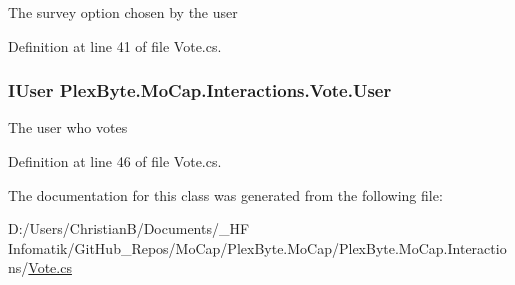The survey option chosen by the user 



Definition at line 41 of file Vote.\+cs.

\subsubsection[{\texorpdfstring{User}{User}}]{\setlength{\rightskip}{0pt plus 5cm}I\+User Plex\+Byte.\+Mo\+Cap.\+Interactions.\+Vote.\+User\hspace{0.3cm}{\ttfamily [get]}}\hypertarget{class_plex_byte_1_1_mo_cap_1_1_interactions_1_1_vote_a704a068395851baacc22e71db46d3ea8}{}\label{class_plex_byte_1_1_mo_cap_1_1_interactions_1_1_vote_a704a068395851baacc22e71db46d3ea8}


The user who votes 



Definition at line 46 of file Vote.\+cs.



The documentation for this class was generated from the following file\+:\begin{DoxyCompactItemize}
\item 
D\+:/\+Users/\+Christian\+B/\+Documents/\+\_\+\+H\+F Infomatik/\+Git\+Hub\+\_\+\+Repos/\+Mo\+Cap/\+Plex\+Byte.\+Mo\+Cap/\+Plex\+Byte.\+Mo\+Cap.\+Interactions/\hyperlink{_vote_8cs}{Vote.\+cs}\end{DoxyCompactItemize}
